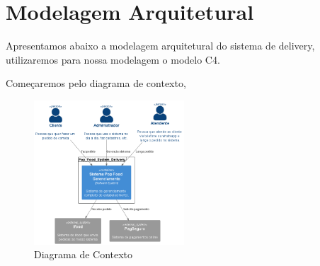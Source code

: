 \chapter{Modelagem Arquitetural}

Apresentamos abaixo a modelagem arquitetural do sistema de delivery, utilizaremos para nossa modelagem o modelo C4.

Começaremos pelo diagrama de contexto, 
\begin{figure}[h]
    \centering
    \includegraphics[width=0.5\textwidth]{diagrama_contexto.png}
    \caption{Diagrama de Contexto}
    \label{fig:Diagrama de Contexto}
  \end{figure}